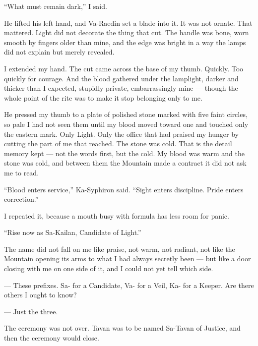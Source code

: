 ``What must remain dark,'' I said.\par

He lifted his left hand, and Va-Raedin set a blade into it. 
It was not ornate. 
That mattered. 
Light did not decorate the thing that cut. 
The handle was bone, worn smooth by fingers older than mine, and the edge was bright in a way the lamps did not explain but merely revealed.\par

I extended my hand. 
The cut came across the base of my thumb. 
Quickly. 
Too quickly for courage. 
And the blood gathered under the lamplight, darker and thicker than I expected, stupidly private, embarrassingly mine --- though the whole point of the rite was to make it 
stop belonging only to me.\par

He pressed my thumb to a plate of polished stone marked with five faint circles, so pale I had not seen them until my blood moved toward one and touched only the eastern mark. 
Only Light. 
Only the office that had praised my hunger by cutting the part of me that reached. 
The stone was cold. 
That is the detail memory kept --- not the words first, but the cold. 
My blood was warm and the stone was cold, and between them the Mountain made a contract it did not ask me to read.\par

``Blood enters service,'' Ka-Syphiron said. ``Sight enters discipline. Pride enters correction.''\par

I repeated it, because a mouth busy with formula has less room for panic.\par

``Rise now as Sa-Kailan, Candidate of Light.''\par

The name did not fall on me like praise, not warm, not radiant, not like the Mountain opening its arms to what I had always secretly been --- but like a door closing with me on 
one side of it, and I could not yet tell which side. 

\begin{room}

--- These prefixes. Sa- for a Candidate, Va- for a Veil, Ka- for a Keeper. Are there others I ought to know?

--- Just the three.

\end{room}

The ceremony was not over. Tavan was to be named Sa-Tavan of Justice, and then the ceremony would close.

